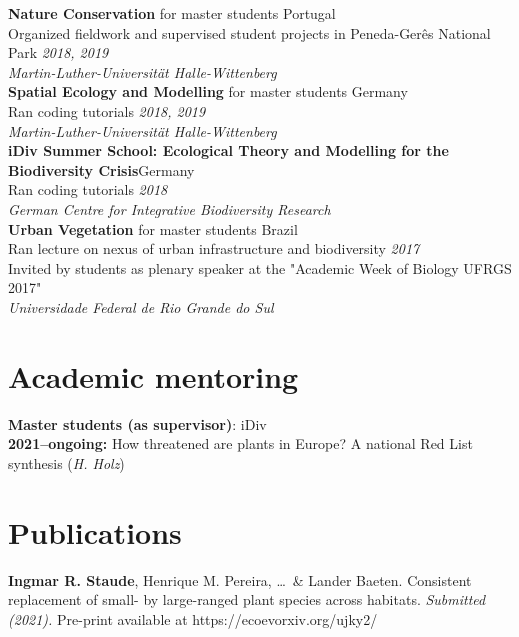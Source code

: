 \documentclass[a4paper,11pt]{article} %
\begin{document}
\normalsize\textbf{Nature Conservation} for master students \hfill Portugal\\
Organized fieldwork and supervised student projects in Peneda-Gerês National Park \textit{\hfill 2018, 2019} \\
\small\textit{Martin-Luther-Universität Halle-Wittenberg} \\

\normalsize\textbf{Spatial Ecology and Modelling} for master students \hfill Germany\\
Ran coding tutorials \textit{\hfill 2018, 2019}\\
\small\textit{Martin-Luther-Universität Halle-Wittenberg} \\

\normalsize\textbf{iDiv Summer School: Ecological Theory and Modelling for the Biodiversity Crisis}\hfill Germany \\
Ran coding tutorials \textit{\hfill 2018}\\
\small\textit{German Centre for Integrative Biodiversity Research} \\

\normalsize\textbf{Urban Vegetation} for master students \hfill Brazil\\
Ran lecture on nexus of urban infrastructure and biodiversity \textit{\hfill 2017}\\
Invited by students as plenary speaker at the "Academic Week of Biology UFRGS 2017"\\
\small\textit{Universidade Federal de Rio Grande do Sul} \\


\section{Academic mentoring}
\normalsize\textbf{Master students (as supervisor)}: iDiv\\
\normalsize\textbf{2021--ongoing:} How threatened are plants in Europe? A national Red List synthesis (\textit{H. Holz})



\section{Publications}

\normalsize\textbf{Ingmar R. Staude}, Henrique M. Pereira, \ldots\ \& Lander Baeten. Consistent replacement of small- by large-ranged plant species across habitats. \textit{Submitted (2021).} Pre-print available at https://ecoevorxiv.org/ujky2/ \\
\end{document}

